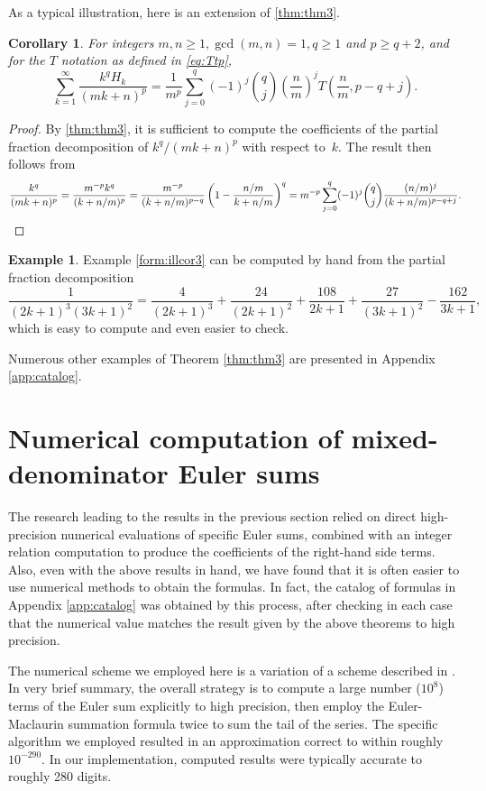 \documentclass{article}
\newtheorem{corollary}{Corollary}
\theoremstyle{definition}
\newtheorem{example}{Example}
\begin{document}
\noindent
As a typical illustration, here is an extension of 
\cref{thm:thm3}.
\begin{corollary} \label{cor:cor2}
For integers $m, n \geq 1, \gcd (m, n) = 1, q \geq 1$ and $p \geq q+2$, and for the $T$ notation as defined in \cref{eq:Ttp},
\[\sum_{k=1}^\infty \frac{k^q H_k}{(mk+n)^p} =\frac1{m^p} \sum_
{j=0}^q 
(-1)^j
\binom{q}{j} \left(\frac nm\right)^j T \left(\frac nm,p-q+j\right).\]
\end{corollary}
\begin{proof} By \cref{thm:thm3}, it is sufficient to compute the
coefficients of the partial fraction decomposition of $k^q/(mk+n)^p$
with respect to~$k$. The result then follows from
\[\frac{k^q}{(mk+n)^p}=\frac{m^{-p}k^q}{(k+n/m)^p}=\frac{m^{-p}}{(k+n/m)^
{p-q}}\left (1- \frac{n/m}
{k+n/m}\right)^q=m^{-p}\sum_{j=0}^q (-1)^j \binom{q}{j} \frac{(n/m)^j}
{
(k+n/m)^
{p-q+j}}.\qedhere\]
\end{proof}
\begin{example}
Example \ref{form:illcor3} can be computed by hand from
the partial fraction decomposition 
\[\frac{1}{(2k+1)^3(3k+1)^2}=
\frac4{(2k+1)^3}
+\frac{24}{(2k+1)^2}
+\frac{108}{2k+1}
+\frac{27}{(3k+1)^2}
-\frac{162}{3k+1},
\]
which is easy to compute and even easier to check. 
\end{example}
Numerous other examples of Theorem \ref{thm:thm3} are presented in Appendix \ref{app:catalog}.

\section{Numerical computation of mixed-denominator Euler sums} 
\label{sec:direct}

The research leading to the results in the previous section relied on direct high-precision numerical evaluations of specific Euler sums, combined with an integer relation computation to produce the coefficients of the right-hand side terms. Also, even with the above results in hand, we have found that it is often easier to use numerical methods to obtain the formulas. In fact, the catalog of formulas in Appendix \ref{app:catalog} was obtained by this process, after checking in each case that the numerical value matches the result given by the above theorems to high precision.

The numerical scheme we employed here is a variation of a scheme described in \cite{McPBai2025}. In very brief summary, the overall strategy is to compute a large number ($10^8$) terms of the Euler sum explicitly to high precision, then employ the Euler-Maclaurin summation formula \cite[pg.~285]{Atkinson1989} twice to sum the tail of the series. The specific algorithm we employed resulted in an approximation correct to within roughly $10^{-290}$.  In our implementation, computed results were typically accurate to roughly 280 digits. 
\end{document}
